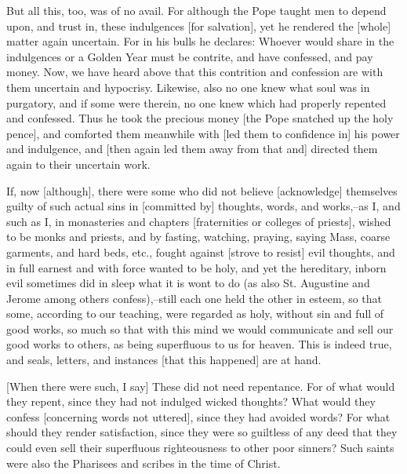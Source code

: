 But all this, too, was of no avail. For although the Pope
taught men to depend upon, and trust in, these indulgences
[for salvation], yet he rendered the [whole] matter again
uncertain. For in his bulls he declares: Whoever would share
in the indulgences or a Golden Year must be contrite, and have
confessed, and pay money. Now, we have heard above that this
contrition and confession are with them uncertain and
hypocrisy. Likewise, also no one knew what soul was in
purgatory, and if some were therein, no one knew which had
properly repented and confessed. Thus he took the precious
money [the Pope snatched up the holy pence], and comforted
them meanwhile with [led them to confidence in] his power and
indulgence, and [then again led them away from that and]
directed them again to their uncertain work.

If, now [although], there were some who did not believe
[acknowledge] themselves guilty of such actual sins in
[committed by] thoughts, words, and works,--as I, and such
as I, in monasteries and chapters [fraternities or colleges of
priests], wished to be monks and priests, and by fasting,
watching, praying, saying Mass, coarse garments, and hard
beds, etc., fought against [strove to resist] evil thoughts,
and in full earnest and with force wanted to be holy, and yet
the hereditary, inborn evil sometimes did in sleep what it is
wont to do (as also St. Augustine and Jerome among others
confess),--still each one held the other in esteem, so that
some, according to our teaching, were regarded as holy,
without sin and full of good works, so much so that with this
mind we would communicate and sell our good works to others,
as being superfluous to us for heaven. This is indeed true,
and seals, letters, and instances [that this happened] are at
hand.

[When there were such, I say] These did not need repentance.
For of what would they repent, since they had not indulged
wicked thoughts? What would they confess [concerning words not
uttered], since they had avoided words? For what should they
render satisfaction, since they were so guiltless of any deed
that they could even sell their superfluous righteousness to
other poor sinners? Such saints were also the Pharisees and
scribes in the time of Christ.

